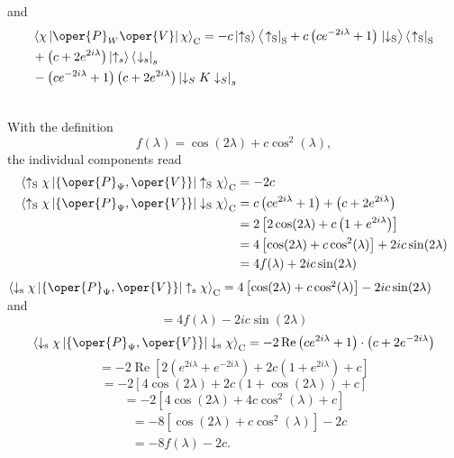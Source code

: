 and
$$
\begin{aligned}
& \left\langle\chi\left|\oper{P}_W \oper{V}\right| \chi\right\rangle_{\mathrm{C}}=-c\left|\uparrow_{\mathrm{S}}\right\rangle\left\langle\left.\uparrow_{\mathrm{S}}\right|_{\mathrm{S}}+c\left(c e^{-2 i \lambda}+1\right) \mid \downarrow_{\mathrm{S}}\right\rangle\left\langle\left.\uparrow_{\mathrm{S}}\right|_{\mathrm{S}}\right. \\
& +\left(c+2 e^{2 i \lambda}\right)\left|\uparrow_s\right\rangle\left\langle\left.\downarrow_s\right|_s\right. \\
& -\left(c e^{-2 i \lambda}+1\right)\left(c+2 e^{2 i \lambda}\right)\left|\downarrow_S K \downarrow_S\right|_s \\
&
\end{aligned}
$$

With the definition
$$
f(\lambda)=\cos (2 \lambda)+c \cos ^2(\lambda),
$$
the individual components read
$$
\begin{aligned}
\left\langle\uparrow_{\mathrm{S}} \chi\left|\left\{\oper{P}_{\Psi}, \oper{V}\right\}\right| \uparrow_{\mathrm{S}} \chi\right\rangle_{\mathrm{C}} & =-2 c \\
\left\langle\uparrow_{\mathrm{S}} \chi\left|\left\{\oper{P}_{\Psi}, \oper{V}\right\}\right| \downarrow_{\mathrm{S}} \chi\right\rangle_{\mathrm{C}} & =c\left(c e^{2 i \lambda}+1\right)+\left(c+2 e^{2 i \lambda}\right) \\
& =2\left[2 \cos (2 \lambda)+c\left(1+e^{2 i \lambda}\right)\right] \\
& =4\left[\cos (2 \lambda)+c \cos ^2(\lambda)\right]+2 i c \sin (2 \lambda) \\
& =4 f(\lambda)+2 i c \sin (2 \lambda)
\end{aligned}
$$
$\left\langle\downarrow_{\mathrm{s}} \chi\left|\left\{\oper{P}_{\Psi}, \oper{V}\right\}\right| \uparrow_{\mathrm{s}} \chi\right\rangle_{\mathrm{C}}=4\left[\cos (2 \lambda)+c \cos ^2(\lambda)\right]-2 i c \sin (2 \lambda) \quad$ and
$$
=4 f(\lambda)-2 i c \sin (2 \lambda)
$$
$$
\left\langle\downarrow_{\mathrm{s}} \chi\left|\left\{\oper{P}_{\Psi}, \oper{V}\right\}\right| \downarrow_{\mathrm{s}} \chi\right\rangle_{\mathrm{C}}=-2 \operatorname{Re}\left(c e^{2 i \lambda}+1\right) \cdot\left(c+2 e^{-2 i \lambda}\right)
$$
$$
=-2 \operatorname{Re}\left[2\left(e^{2 i \lambda}+e^{-2 i \lambda}\right)+2 c\left(1+e^{2 i \lambda}\right)+c\right]
$$
$$
=-2[4 \cos (2 \lambda)+2 c(1+\cos (2 \lambda))+c]
$$
$$
=-2\left[4 \cos (2 \lambda)+4 c \cos ^2(\lambda)+c\right]
$$
$$
\begin{aligned}
& =-8\left[\cos (2 \lambda)+c \cos ^2(\lambda)\right]-2 c \\
& =-8 f(\lambda)-2 c .
\end{aligned}
$$

